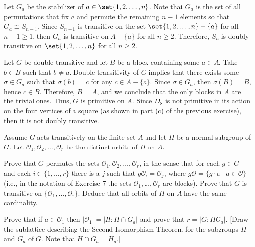 \begin{solalph}
	\item Let $G_a$ be the stabilizer of $a \in \set{1, 2, \ldots, n}$. Note that $G_a$ is the set of all permutations that fix $a$ and permute the remaining $n - 1$ elements so that $G_a \cong S_{n - 1}$. Since $S_{n - 1}$ is transitive on the set $\set{1, 2, \ldots, n} - \{a\}$ for all $n - 1 \geq 1$, then $G_a$ is transitive on $A - \{a\}$ for all $n \geq 2$. Therefore, $S_n$ is doubly transitive on $\set{1, 2, \ldots, n}$ for all $n \geq 2$.
	\item Let $G$ be double transitive and let $B$ be a block containing some $a \in A$. Take $b \in B$ such that $b \neq a$. Double transitivity of $G$ implies that there exists some $\sigma \in G_a$ such that $\sigma(b) = c$ for any $c \in A - \{a\}$. Since $\sigma \in G_a$, then $\sigma(B) = B$, hence $c \in B$. Therefore, $B = A$, and we conclude that the only blocks in $A$ are the trivial ones. Thus, $G$ is primitive on $A$. Since $D_8$ is not primitive in its action on the four vertices of a square (as shown in part (c) of the previous exercise), then it is not doubly transitive.
\end{solalph}

\begin{specialexercise}
	\label{ex4.1.9} Assume $G$ acts transitively on the finite set $A$ and let $H$ be a normal subgroup of $G$. Let $\mathcal{O}_1, \mathcal{O}_2, \ldots, \mathcal{O}_r$ be the distinct orbits of $H$ on $A$.
	\begin{subproblems}
		\item Prove that $G$ permutes the sets $\mathcal{O}_1, \mathcal{O}_2, \ldots, \mathcal{O}_r$, in the sense that for each $g \in G$ and each $i \in \{1,\ldots,r\}$ there is a $j$ such that $g \mathcal{O}_i = \mathcal{O}_j$, where $g\mathcal{O} = \{g \cdot a \mid a \in \mathcal{O}\}$ (i.e., in the notation of Exercise 7 the sets $\mathcal{O}_1, \ldots, \mathcal{O}_r$ are blocks). Prove that $G$ is transitive on $\{\mathcal{O}_1, \ldots, \mathcal{O}_r\}$. Deduce that all orbits of $H$ on $A$ have the same cardinality.
		\item Prove that if $a \in \mathcal{O}_1$ then $|\mathcal{O}_1| = |H : H \cap G_a|$ and prove that $r = |G : HG_a|$. [Draw the sublattice describing the Second Isomorphism Theorem for the subgroups $H$ and $G_a$ of $G$. Note that $H \cap G_a = H_a$.]
	\end{subproblems}
\end{specialexercise}

